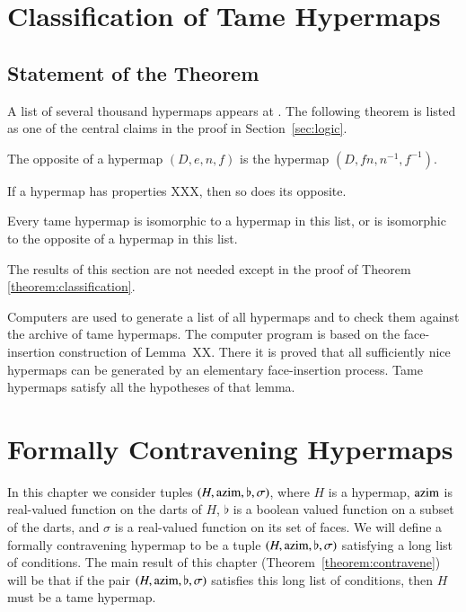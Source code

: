 \chapter{Classification of Tame Hypermaps}
    \label{sec:proof-classification}

\section{Statement of the Theorem}
\label{sec:classification}

A list of several thousand hypermaps appears at \cite{web}. The
following theorem is listed as one of the central claims in the
proof in Section~\ref{sec:logic}.

\begin{definition} The opposite of a hypermap $(D,e,n,f)$ is the
hypermap $(D,f n,n^{-1},f^{-1})$.
\end{definition}

\begin{lemma} If a hypermap has properties XXX, then so does its
opposite.
\end{lemma}

\begin{theorem}
\label{theorem:classification} Every tame hypermap is isomorphic to
a hypermap in this list, or is isomorphic to the opposite of a
hypermap in this list.
\end{theorem}

The results of this section are not needed except in the proof of
Theorem \ref{theorem:classification}.

\smallskip

Computers are used to generate a list of all hypermaps and to check
them against the archive of tame hypermaps.  The computer program is
based on the face-insertion construction of Lemma~XX.  There it is
proved that all sufficiently nice hypermaps can be generated by an
elementary face-insertion process.  Tame hypermaps satisfy all the
hypotheses of that lemma.



\chapter{Formally Contravening Hypermaps}
    \label{sec:startame}

In this chapter we consider tuples $(H,{\operatorname{azim}},\flat,\sigma)$, where
$H$ is a hypermap, ${\operatorname{azim}}$ is real-valued function on the darts of
$H$, $\flat$ is a  boolean valued function on a subset of the darts,
and $\sigma$ is a real-valued function on its set of faces. We will
define a formally contravening hypermap to be a tuple
$(H,{\operatorname{azim}},\flat,\sigma)$ satisfying a long list of conditions. The
main result of this chapter (Theorem~\ref{theorem:contravene}) will
be that if the pair $(H,{\operatorname{azim}},\flat,\sigma)$ satisfies this long
list of conditions, then $H$ must be a tame hypermap.

